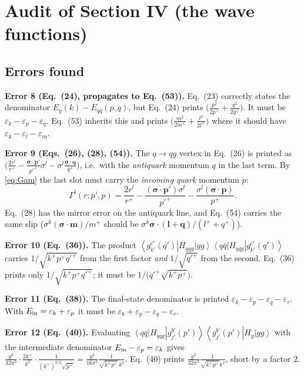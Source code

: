 \documentclass[11pt]{article}
\newcommand{\eps}{\varepsilon}
\newcommand{\ket}[1]{\left|#1\right\rangle}
\newcommand{\bra}[1]{\left\langle#1\right|}
\newcommand{\Gam}{\Gamma}
\newcommand{\gl}[3]{g^{#1}_{#2}(#3)}
\begin{document}
\section{Audit of Section IV (the wave functions)}

\subsection{Errors found}

\begin{err}
\textbf{Error 8 (Eq.~(24), propagates to Eq.~(53)).} Eq.~(23) correctly states the denominator
$E_{g}(k)-E_{q\bar q}(p,q)$, but Eq.~(24) prints
$\big(\tfrac{p^{2}}{2p^{+}}+\tfrac{q^{2}}{2q^{+}}\big)$. It must be
$\eps_{k}-\eps_{p}-\eps_{q}$. Eq.~(53) inherits this and prints
$\big(\tfrac{m^{2}}{2m^{+}}+\tfrac{l^{2}}{2l^{+}}\big)$ where it should have
$\eps_{k}-\eps_{l}-\eps_{m}$.

\textbf{Error 9 (Eqs.~(26), (28), (54)).} The $q\to qg$ vertex in Eq.~(26) is printed as
$\big(\tfrac{2r^{l}}{r^{+}}-\tfrac{\bm\sigma\cdot\bm p'}{p'^{+}}\sigma^{l}
-\sigma^{l}\tfrac{\bm\sigma\cdot\bm q}{q^{+}}\big)$, i.e.\ with the \emph{antiquark} momentum
$q$ in the last term. By \eqref{eq:Gam} the last slot must carry the \emph{incoming quark}
momentum $p$:
\[
\Gam^{l}(r;p',p)=\frac{2r^{l}}{r^{+}}-\frac{(\bm\sigma\!\cdot\!\bm p')\sigma^{l}}{p'^{+}}
-\frac{\sigma^{l}(\bm\sigma\!\cdot\!\bm p)}{p^{+}} .
\]
Eq.~(28) has the mirror error on the antiquark line, and Eq.~(54) carries the same slip
($\sigma^{k}(\bm\sigma\!\cdot\!\bm m)/m^{+}$ should be
$\sigma^{k}\bm\sigma\!\cdot\!(\bm l+\bm q)/(l^{+}+q^{+})$).

\textbf{Error 10 (Eq.~(36)).} The product
$\bra{\gl{c'}{k'}{q'}}H_{ggg}\ket{gg}\bra{q\bar q}H_{q\bar qg}\ket{\gl{c'}{k'}{q'}}$ carries
$1/\sqrt{k^{+}p^{+}q'^{+}}$ from the first factor \emph{and} $1/\sqrt{q'^{+}}$ from the second.
Eq.~(36) prints only $1/\sqrt{k^{+}p^{+}q'^{+}}$; it must be $1/\big(q'^{+}\sqrt{k^{+}p^{+}}\big)$.

\textbf{Error 11 (Eq.~(38)).} The final-state denominator is printed
$\eps_{k}-\eps_{p}-\eps_{q}-\eps_{r}$. With $E_{\rm in}=\eps_{k}+\eps_{p}$ it must be
$\eps_{k}+\eps_{p}-\eps_{q}-\eps_{r}$.

\textbf{Error 12 (Eq.~(40)).} Evaluating
$\bra{q\bar q}H_{q\bar qg}\ket{\gl{b'}{j'}{p'}}\bra{\gl{b'}{j'}{p'}}H_{g}\ket{gg}$ with the
intermediate denominator $E_{\rm in}-\eps_{p}=\eps_{k}$ gives
$\tfrac{g^{2}}{32\pi^{3}}\cdot\tfrac{2k^{+}}{k^{2}}\cdot\tfrac{1}{(k^{+})^{3/2}\sqrt{p^{+}}}
=\tfrac{g^{2}}{16\pi^{3}}\tfrac{1}{\sqrt{k^{+}p^{+}}\,k^{2}}$. Eq.~(40) prints
$\tfrac{g^{2}}{32\pi^{3}}\tfrac{1}{\sqrt{k^{+}p^{+}}k^{2}}$, short by a factor $2$.


\end{err}
\end{document}
